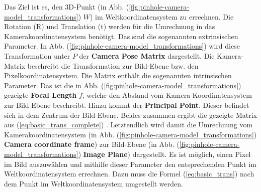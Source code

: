 	Das Ziel ist es, den 3D-Punkt (in Abb. (\ref{fig:pinhole-camera-model_transformations}) \( W \)) im Weltkoordinatensystem zu errechnen. Die Rotation (R) und Translation (t) werden für die Umrechnung in das Kamerakoordinatensystem benötigt. Das sind die sogenannten extrinsischen Parameter. In Abb. (\ref{fig:pinhole-camera-model_transformations}) wird diese Transformation unter \( P \) der \textbf{Camera Pose Matrix} dargestellt. \newline
	Die Kamera-Matrix beschreibt die Transformation zur Bild-Ebene bzw. den Pixelkoordinatensystem. Die Matrix enthält die sogenannten intrinsischen Parameter. Das ist die in Abb. (\ref{fig:pinhole-camera-model_transformations}) gezeigte \textbf{Focal Length} \( f \), welche den Abstand vom Kamera-Koordinatensystem zur Bild-Ebene beschreibt. Hinzu kommt der \textbf{Principal Point}. Dieser befindet sich in dem Zentrum der Bild-Ebene. Beides zusammen ergibt die gezeigte Matrix aus (\ref{eq:basic_trans_complete}) \citep[vgl.][]{noauthor_opencv_nodate-1}. Letztendlich wird damit die Umrechnung vom Kamerakoordinatensystem (in Abb. (\ref{fig:pinhole-camera-model_transformations}) \textbf{Camera coordinate frame}) zur Bild-Ebene (in Abb. (\ref{fig:pinhole-camera-model_transformations}) \textbf{Image Plane}) dargestellt. \newline 
	Es ist möglich, einen Pixel im Bild auszuwählen und mithilfe dieser Parameter den entsprechenden Punkt im Weltkoordinatensystem errechnen. Dazu muss die Formel (\ref{eq:basic_trans}) nach dem Punkt im Weltkoordinatensystem umgestellt werden.
	
